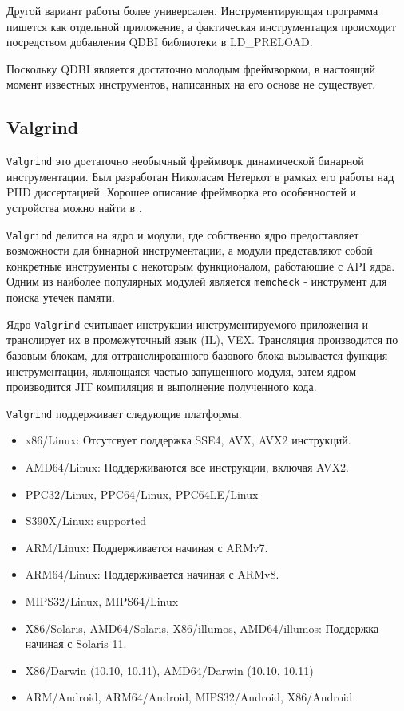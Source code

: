 Другой вариант работы более универсален. Инструментирующая программа пишется как отдельной приложение, а фактическая инструментация происходит посредством добавления QDBI библиотеки в LD\_PRELOAD.

Поскольку QDBI является достаточно молодым фреймворком, в настоящий момент известных инструментов, написанных на его основе не существует.


\subsection{Valgrind}

\texttt{Valgrind} это доcтаточно необычный фреймворк динамической бинарной инструментации. Был разработан Николасам Нетеркот в рамках его работы над PHD диссертацией. Хорошее описание фреймворка его особенностей и устройства можно найти в \cite{VALGRIND}.


\texttt{Valgrind} делится на ядро и модули, где собственно ядро предоставляет возможности для бинарной инструментации, а модули представляют собой конкретные инструменты с некоторым функционалом, работаюшие с API ядра. Одним из наиболее популярных модулей является \texttt{memcheck} - инструмент для поиска утечек памяти.

Ядро \texttt{Valgrind} считывает инструкции инструментируемого приложения и транслирует их в промежуточный язык (IL), VEX. Трансляция производится по базовым блокам, для оттранслированного базового блока вызывается функция инструментации, являющаяся частью запущенного модуля, затем ядром производится JIT компиляция и выполнение полученного кода.

\texttt{Valgrind} поддерживает следующие платформы.

\begin{itemize}

    \item x86/Linux: Отсутсвует поддержка SSE4, AVX, AVX2 инструкций.
    \item AMD64/Linux: Поддерживаются все инструкции, включая AVX2.
    \item PPC32/Linux, PPC64/Linux, PPC64LE/Linux
    \item S390X/Linux: supported
    \item ARM/Linux: Поддерживается начиная с ARMv7.
    \item ARM64/Linux: Поддерживается начиная с ARMv8.
    \item MIPS32/Linux, MIPS64/Linux
    \item X86/Solaris, AMD64/Solaris, X86/illumos, AMD64/illumos: Поддержка начиная с Solaris 11.
    \item X86/Darwin (10.10, 10.11), AMD64/Darwin (10.10, 10.11)
    \item ARM/Android, ARM64/Android, MIPS32/Android, X86/Android:
\end{itemize}

